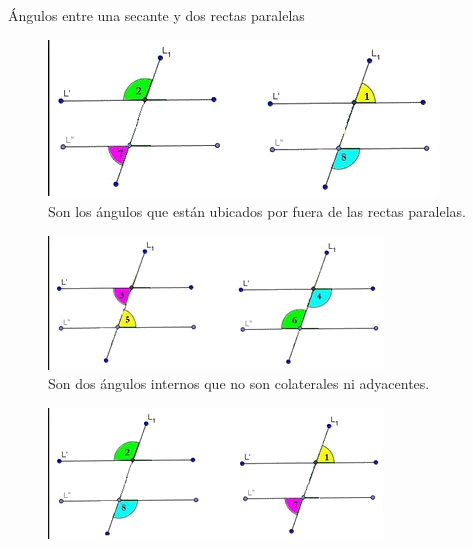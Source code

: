 \begin{notecard}{Ángulos entre una secante y dos rectas paralelas}
\begin{tcbitemize}
        \begin{figure}[H]
            \centering
            \includegraphics[width=\linewidth]{../images/angulos_externos}
            \caption{Son los ángulos que están ubicados por fuera de las rectas paralelas.}
            \label{fig:angulos_externos}
        \end{figure}
        \tcbitem[adjusted title={Ángulos Alternos Internos}]
        \begin{figure}[H]
            \centering
            \includegraphics[width=\linewidth]{../images/angulos_alternos_internos}
            \caption{Son dos ángulos internos que no son colaterales ni adyacentes.}
            \label{fig:angulos_alternos_internos}
        \end{figure}
        \tcbitem[adjusted title={Ángulo Alternos Externos}]
        \begin{figure}[H]
            \centering
            \includegraphics[width=\linewidth]{../images/angulos_alternos_externos}

\end{figure}
\end{tcbitemize}
\end{notecard}
